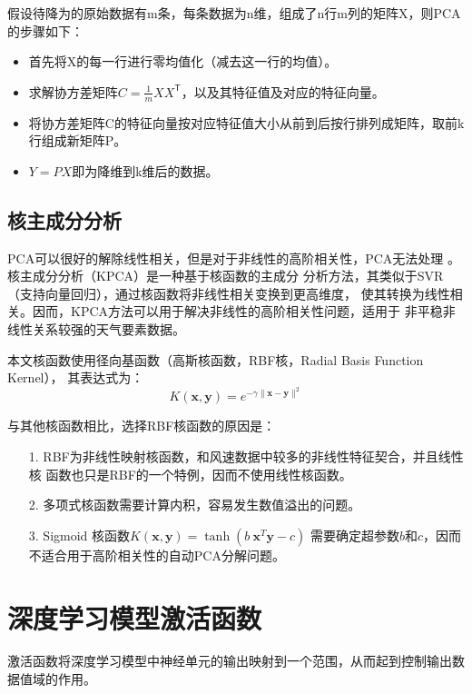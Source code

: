 \documentclass[AutoFakeBold]{LZUThesis}
\begin{document}
假设待降为的原始数据有m条，每条数据为n维，组成了n行m列的矩阵X，则PCA的步骤如下：

\begin{itemize}
    \item 首先将X的每一行进行零均值化（减去这一行的均值）。
    \item 求解协方差矩阵$C=\frac{1}{m}XX^\mathsf{T}$，以及其特征值及对应的特征向量。
    \item 将协方差矩阵C的特征向量按对应特征值大小从前到后按行排列成矩阵，取前k行组成新矩阵P。
    \item $Y=PX$即为降维到k维后的数据。
\end{itemize}

\subsection{核主成分分析}
PCA可以很好的解除线性相关，但是对于非线性的高阶相关性，PCA无法处理
\cite{jolliffe2016principal}。核主成分分析（KPCA）是一种基于核函数的主成分
分析方法，其类似于SVR（支持向量回归），通过核函数将非线性相关变换到更高维度，
使其转换为线性相关。因而，KPCA方法可以用于解决非线性的高阶相关性问题，适用于
非平稳非线性关系较强的天气要素数据。

本文核函数使用径向基函数（高斯核函数，RBF核，Radial Basis Function Kernel），
其表达式为：
$$K(\mathbf x,\mathbf y)=e^{-\gamma\|\mathbf x-\mathbf y\|^2}$$

与其他核函数相比，选择RBF核函数的原因是：

\begin{itemize}
\item[1. ] RBF为非线性映射核函数，和风速数据中较多的非线性特征契合，并且线性核
函数也只是RBF的一个特例，因而不使用线性核函数。
\item[2. ] 多项式核函数需要计算内积，容易发生数值溢出的问题。
\item[3. ] Sigmoid 核函数$K(\mathbf x,\mathbf y)=\tanh(b\:\mathbf x^T\mathbf y-c)$
需要确定超参数$b$和$c$，因而不适合用于高阶相关性的自动PCA分解问题。 
\end{itemize}

\section{深度学习模型激活函数}
激活函数将深度学习模型中神经单元的输出映射到一个范围，从而起到控制输出数据值域的作用。
\end{document}
